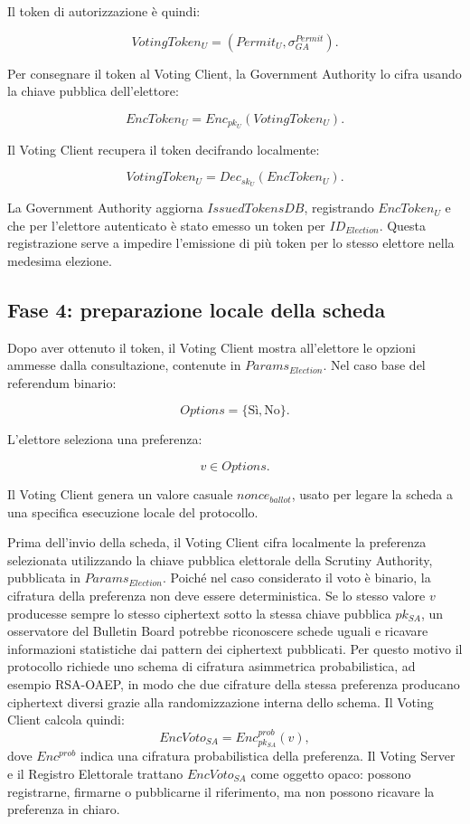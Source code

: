 \documentclass[a4paper,12pt]{article}
\begin{document}
Il token di autorizzazione \`e quindi:

\[
	VotingToken_U =
	(Permit_U, \sigma_{GA}^{Permit}).
\]

Per consegnare il token al Voting Client, la Government Authority lo cifra usando la chiave pubblica dell'elettore:

\[
	EncToken_U =
	Enc_{pk_U}(VotingToken_U).
\]

Il Voting Client recupera il token decifrando localmente:

\[
	VotingToken_U =
	Dec_{sk_U}(EncToken_U).
\]

La Government Authority aggiorna \(IssuedTokensDB\), registrando \(EncToken_U\) e che per l'elettore autenticato \`e stato emesso un token per \(ID_{Election}\).
Questa registrazione serve a impedire l'emissione di pi\`u token per lo stesso elettore nella medesima elezione.

\subsection{Fase 4: preparazione locale della scheda}

Dopo aver ottenuto il token, il Voting Client mostra all'elettore le opzioni ammesse dalla consultazione, contenute in \(Params_{Election}\). 
Nel caso base del referendum binario:

\[
	Options = \{\text{S\`i}, \text{No}\}.
\]

L'elettore seleziona una preferenza:

\[
	v \in Options.
\]

Il Voting Client genera un valore casuale \(nonce_{ballot}\), usato per legare la scheda a una specifica esecuzione locale del protocollo.

Prima dell'invio della scheda, il Voting Client cifra localmente la preferenza selezionata utilizzando la chiave pubblica elettorale della Scrutiny Authority, pubblicata in \(Params_{Election}\). Poich\'e nel caso considerato il voto \`e binario, la cifratura della preferenza non deve essere deterministica. Se lo stesso valore \(v\) producesse sempre lo stesso ciphertext sotto la stessa chiave pubblica \(pk_{SA}\), un osservatore del Bulletin Board potrebbe riconoscere schede uguali e ricavare informazioni statistiche dai pattern dei ciphertext pubblicati. 
Per questo motivo il protocollo richiede uno schema di cifratura asimmetrica probabilistica, ad esempio RSA-OAEP, in modo che due cifrature della stessa preferenza producano ciphertext diversi grazie alla randomizzazione interna dello schema. 
Il Voting Client calcola quindi: \[ EncVoto_{SA} = Enc_{pk_{SA}}^{prob}(v), \] dove \(Enc^{prob}\) indica una cifratura probabilistica della preferenza. Il Voting Server e il Registro Elettorale trattano \(EncVoto_{SA}\) come oggetto opaco: possono registrarne, firmarne o pubblicarne il riferimento, ma non possono ricavare la preferenza in chiaro.
\end{document}
